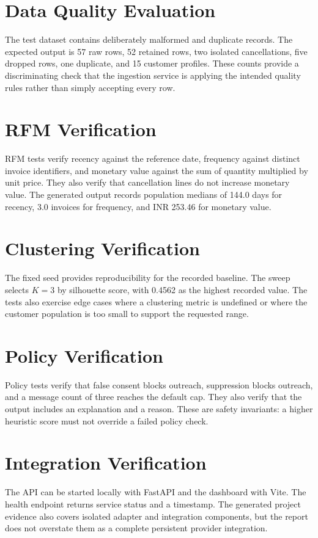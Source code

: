 \documentclass[12pt,a4paper]{report}
\begin{document}
\section{Data Quality Evaluation}
The test dataset contains deliberately malformed and duplicate records. The expected output is 57 raw rows, 52 retained rows, two isolated cancellations, five dropped rows, one duplicate, and 15 customer profiles. These counts provide a discriminating check that the ingestion service is applying the intended quality rules rather than simply accepting every row.

\section{RFM Verification}
RFM tests verify recency against the reference date, frequency against distinct invoice identifiers, and monetary value against the sum of quantity multiplied by unit price. They also verify that cancellation lines do not increase monetary value. The generated output records population medians of 144.0 days for recency, 3.0 invoices for frequency, and INR 253.46 for monetary value.

\section{Clustering Verification}
The fixed seed provides reproducibility for the recorded baseline. The sweep selects $K=3$ by silhouette score, with 0.4562 as the highest recorded value. The tests also exercise edge cases where a clustering metric is undefined or where the customer population is too small to support the requested range.

\section{Policy Verification}
Policy tests verify that false consent blocks outreach, suppression blocks outreach, and a message count of three reaches the default cap. They also verify that the output includes an explanation and a reason. These are safety invariants: a higher heuristic score must not override a failed policy check.

\section{Integration Verification}
The API can be started locally with FastAPI and the dashboard with Vite. The health endpoint returns service status and a timestamp. The generated project evidence also covers isolated adapter and integration components, but the report does not overstate them as a complete persistent provider integration.
\end{document}
